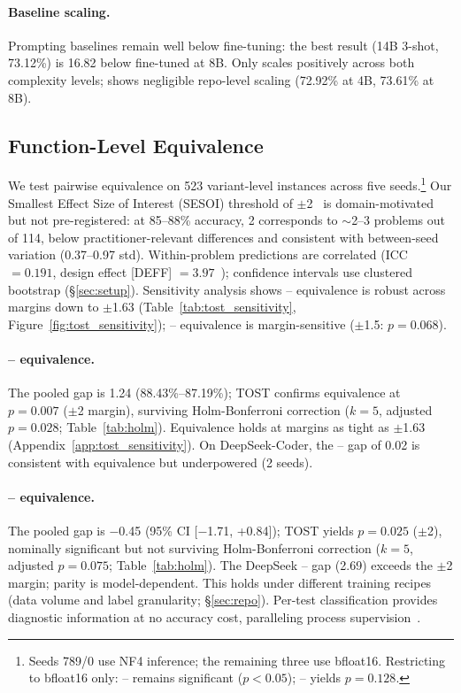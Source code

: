 \paragraph{Baseline scaling.} Prompting baselines remain well below fine-tuning: the best result (14B 3-shot, 73.12\%) is 16.82\pp{} below fine-tuned \cls{} at 8B. Only \cls{} scales positively across both complexity levels; \traj{} shows negligible repo-level scaling (72.92\% at 4B, 73.61\% at 8B).


\subsection{Function-Level Equivalence}
\label{sec:equivalence}

We test pairwise equivalence on 523 variant-level instances across five seeds.\footnote{Seeds 789/0 use NF4 inference; the remaining three use bfloat16. Restricting to bfloat16 only: \cls{}--\cwm{} remains significant ($p{<}0.05$); \cls{}--\traj{} yields $p{=}0.128$.} Our Smallest Effect Size of Interest (SESOI) threshold of $\pm$2\pp{}~\cite{lakens2017,wellek2010} is domain-motivated but not pre-registered: at 85--88\% accuracy, 2\pp{} corresponds to ${\sim}$2--3 problems out of 114, below practitioner-relevant differences and consistent with between-seed variation (0.37--0.97\pp{} std). Within-problem predictions are correlated (ICC $= 0.191$, design effect [DEFF] $= 3.97$~\cite{moulton1990}); confidence intervals use clustered bootstrap (\S\ref{sec:setup}). Sensitivity analysis shows \cls{}--\cwm{} equivalence is robust across margins down to $\pm$1.63\pp{} (Table~\ref{tab:tost_sensitivity}, Figure~\ref{fig:tost_sensitivity}); \cls{}--\traj{} equivalence is margin-sensitive ($\pm$1.5\pp{}: $p{=}0.068$).

\paragraph{\cls{}--\cwm{} equivalence.} The pooled gap is 1.24\pp{} (88.43\%--87.19\%); TOST confirms equivalence at $p = 0.007$ ($\pm$2\pp{} margin), surviving Holm-Bonferroni correction ($k{=}5$, adjusted $p{=}0.028$; Table~\ref{tab:holm}). Equivalence holds at margins as tight as $\pm$1.63\pp{} (Appendix~\ref{app:tost_sensitivity}). On DeepSeek-Coder, the \cls{}--\cwm{} gap of 0.02\pp{} is consistent with equivalence but underpowered (2 seeds).

\paragraph{\cls{}--\traj{} equivalence.} The pooled gap is $-$0.45\pp{} (95\% CI [$-$1.71, +0.84]); TOST yields $p = 0.025$ ($\pm$2\pp{}), nominally significant but not surviving Holm-Bonferroni correction ($k{=}5$, adjusted $p{=}0.075$; Table~\ref{tab:holm}). The DeepSeek \cls{}--\traj{} gap (2.69\pp{}) exceeds the $\pm$2\pp{} margin; \traj{} parity is model-dependent. This holds under different training recipes (data volume and label granularity; \S\ref{sec:repo}). Per-test classification provides diagnostic information at no accuracy cost, paralleling process supervision~\cite{lightman2023letsverify}.

